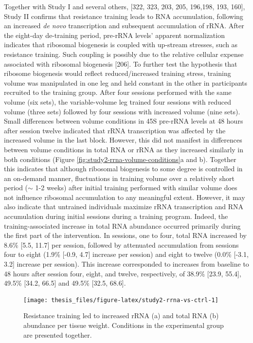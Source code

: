\documentclass[twoside,10pt]{gihclass} %
\begin{document}
Together with Study I and several others,
{[}322, 323, 203, 205,
196,198, 193, 160{]},
Study II confirms that resistance training leads to RNA accumulation, following an increased \emph{de novo} transcription and subsequent accumulation of rRNA. After the eight-day de-training period, pre-rRNA levels' apparent normalization indicates that ribosomal biogenesis is coupled with up-stream stresses, such as resistance training. Such coupling is possibly due to the relative cellular expense associated with ribosomal biogenesis {[}206{]}.
To further test the hypothesis that ribosome biogenesis would reflect reduced/increased training stress, training volume was manipulated in one leg and held constant in the other in participants recruited to the training group.
After four sessions performed with the same volume (six sets), the variable-volume leg trained four sessions with reduced volume (three sets) followed by four sessions with increased volume (nine sets). Small differences between volume conditions in 45S pre-rRNA levels at 48 hours after session twelve indicated that rRNA transcription was affected by the increased volume in the last block. However, this did not manifest in differences between volume conditions in total RNA or rRNA as they increased similarly in both conditions (Figure \ref{fig:study2-rrna-volume-conditions}a and b). Together this indicates that although ribosomal biogenesis to some degree is controlled in an on-demand manner, fluctuations in training volume over a relatively short period (\(\sim\) 1-2 weeks) after initial training performed with similar volume does not influence ribosomal accumulation to any meaningful extent.
However, it may also indicate that untrained individuals maximize rRNA transcription and RNA accumulation during initial sessions during a training program.
Indeed, the training-associated increase in total RNA abundance occurred primarily during the first part of the intervention. In sessions, one to four, total RNA increased by 8.6\% {[}5.5, 11.7{]} per session, followed by attenuated accumulation from sessions four to eight (1.9\% {[}-0.9, 4.7{]} increase per session) and eight to twelve (0.0\% {[}-3.1, 3.2{]} increase per session). This increase corresponded to increases from baseline to 48 hours after session four, eight, and twelve, respectively, of 38.9\% {[}23.9, 55.4{]}, 49.5\% {[}34.2, 66.5{]} and 49.5\% {[}32.5, 68.6{]}.
\begin{figure}

{\centering \texttt{[image: thesis\_files/figure-latex/study2-rrna-vs-ctrl-1]} 

}

\caption[rRNA and total RNA changes in response to resistance training.]{Resistance training led to increased rRNA (a) and total RNA (b) abundance per tissue weight. Conditions in the experimental group are presented together.}\label{fig:study2-rrna-vs-ctrl}
\end{figure}
\end{document}
